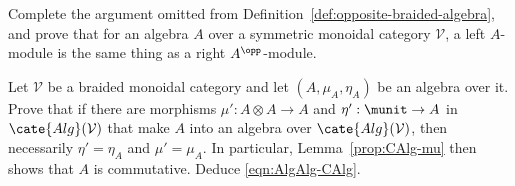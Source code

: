 
\begin{Exercises}
	\item Complete the argument omitted from
	Definition~\ref{def:opposite-braided-algebra}, and prove that for an
	algebra $A$ over a symmetric monoidal category $\mathcal{V}$, a left
	$A$-module is the same thing as a right $A^{\opp}$-module.

	\item Let $\mathcal{V}$ be a braided monoidal category and let
	$(A,\mu_A,\eta_A)$ be an algebra over it. Prove that if there are morphisms
	$\mu':A\otimes A\to A$ and $\eta':\munit\to A$ in
	$\cate{Alg}(\mathcal{V})$ that make $A$ into an algebra over
	$\cate{Alg}(\mathcal{V})$, then necessarily $\eta'=\eta_A$ and
	$\mu'=\mu_A$. In particular, Lemma~\ref{prop:CAlg-mu} then shows that $A$
	is commutative. Deduce \eqref{eqn:AlgAlg-CAlg}.


\end{Exercises}
